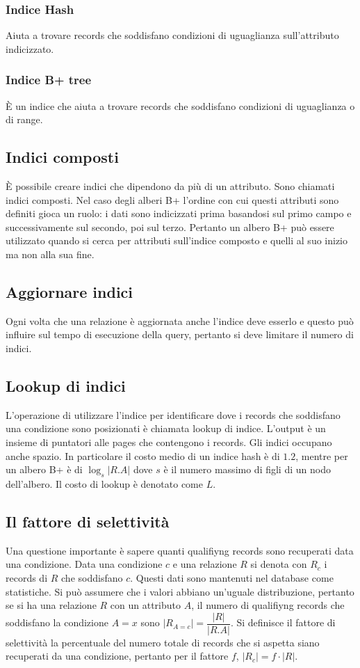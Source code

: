 \subsubsection{Indice Hash}
Aiuta a trovare records che soddisfano condizioni di uguaglianza sull'attributo indicizzato.
\subsubsection{Indice B+ tree}
\`E un indice che aiuta  a trovare records che soddisfano condizioni di uguaglianza o di range. 
\subsection{Indici composti}
\`E possibile creare indici che dipendono da pi\`u di un attributo. Sono chiamati indici composti. Nel caso degli alberi B+ l'ordine con cui questi attributi sono definiti gioca un ruolo: i dati sono indicizzati prima
basandosi sul primo campo e successivamente sul secondo, poi sul terzo. Pertanto un albero B+ pu\`o essere utilizzato quando si cerca per attributi sull'indice composto e quelli al suo inizio ma non alla sua fine. 
\subsection{Aggiornare indici}
Ogni volta che una relazione \`e aggiornata anche l'indice deve esserlo e questo pu\`o influire sul tempo di esecuzione della query, pertanto si deve limitare il numero di indici.
\subsection{Lookup di indici}
L'operazione di utilizzare l'indice per identificare dove i records che soddisfano una condizione sono posizionati \`e chiamata lookup di indice. L'output \`e un insieme di puntatori alle pages che contengono i 
records. Gli indici occupano anche spazio. In particolare il costo medio di un indice hash \`e di $1.2$, mentre per un albero B+ \`e di $\log_s|R.A|$ dove $s$ \`e il numero massimo di figli di un nodo dell'albero.
Il costo di lookup \`e denotato come $L$. 
\subsection{Il fattore di selettivit\`a}
Una questione importante \`e sapere quanti qualifiyng records sono recuperati data una condizione. Data una condizione $c$ e una relazione $R$ si denota con $R_c$ i records di $R$ che soddisfano $c$. Questi
dati sono mantenuti nel database come statistiche. Si pu\`o assumere che i valori abbiano un'uguale distribuzione, pertanto se si ha una relazione $R$ con un attributo $A$, il numero di qualifiyng records che 
soddisfano la condizione $A=x$ sono $|R_{A=c}|=\dfrac{|R|}{|R.A|}$. Si definisce il fattore di selettivit\`a la percentuale del numero totale di records che si aspetta siano recuperati da una condizione, pertanto 
per il fattore $f$, $|R_c|=f\cdot|R|$. 
